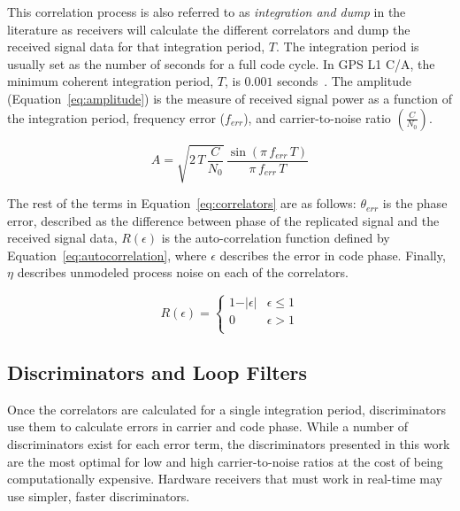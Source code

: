 This correlation process is also referred to as \textit{integration and dump} in the literature as receivers will calculate the different correlators and dump the received signal data for that integration period, \(T\). The integration period is usually set as the number of seconds for a full code cycle. In GPS L1 C/A, the minimum coherent integration period, \(T\), is \(0.001\) seconds~\cite{akosGNSSSoftwareDefined2022}. The amplitude (Equation~\ref{eq:amplitude}) is the measure of received signal power as a function of the integration period, frequency error (\(f_{err}\)), and carrier-to-noise ratio \(\left(\frac{C}{N_0}\right)\).

\begin{equation}\label{eq:amplitude}
    A = \sqrt{2\,T\,\frac{C}{N_0}}\, \frac{\sin\left(\pi \, f_{err} \, T \right)}{\pi \, f_{err} \, T}
\end{equation}

The rest of the terms in Equation~\ref{eq:correlators} are as follows: \(\theta_{err}\) is the phase error, described as the difference between phase of the replicated signal and the received signal data, \(R(\epsilon)\) is the auto-correlation function defined by Equation~\ref{eq:autocorrelation}, where \(\epsilon \) describes the error in code phase. Finally, \(\eta \) describes unmodeled process noise on each of the correlators.

\begin{equation}\label{eq:autocorrelation}
    R(\epsilon) =
    \begin{cases}
        1 - \vert \epsilon \vert & \epsilon \leq 1 \\
        0                        & \epsilon > 1    \\
    \end{cases}
\end{equation}

\subsection{\textbf{Discriminators and Loop Filters}}
Once the correlators are calculated for a single integration period, discriminators use them to calculate errors in carrier and code phase. While a number of discriminators exist for each error term, the discriminators presented in this work are the most optimal for low and high carrier-to-noise ratios at the cost of being computationally expensive. Hardware receivers that must work in real-time may use simpler, faster discriminators.


